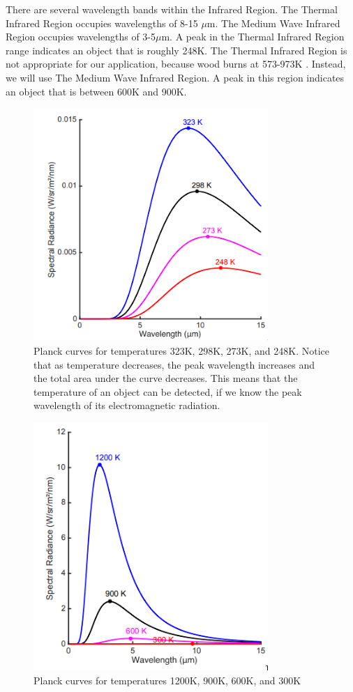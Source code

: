 \documentclass[12pt,journal,compsoc]{IEEEtran}
\begin{document}
There are several wavelength bands within the Infrared Region. The Thermal Infrared Region occupies wavelengths of 8-15 $\mu$m. 
The Medium Wave Infrared Region occupies wavelengths of 3-5$\mu$m. A peak in the Thermal Infrared Region range indicates an object that is roughly 248K. 
The Thermal Infrared Region is not appropriate for our application, because wood burns at 573-973K \cite{estimating_wildfire}.
Instead, we will use The Medium Wave Infrared Region. 
A peak in this region indicates an object that is between 600K and 900K.

\begin{figure}[h]
\centering
\includegraphics[width=3.5in]{plancka.png}
\caption{Planck curves for temperatures 323K, 298K, 273K, and 248K. Notice that as temperature decreases, the peak wavelength increases and the total area under the curve decreases. This means that the temperature of an object can be detected, if we know the peak wavelength of its electromagnetic radiation.}
\label{plancka_image}
\end{figure}

\begin{figure}[h]
\centering
\includegraphics[width=3.5in]{planckb.png}
\caption{Planck curves for temperatures 1200K, 900K, 600K, and 300K}
\label{planckb_image}
\end{figure}
\end{document}
